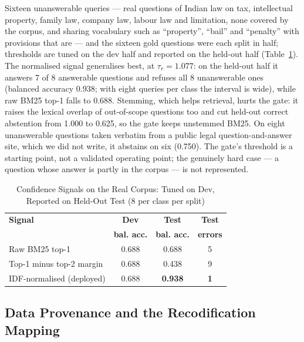 \documentclass[conference]{IEEEtran}
\begin{document}
Sixteen unanswerable queries --- real questions of Indian law on tax, intellectual property, family law, company law, labour law and limitation, none covered by the corpus, and sharing vocabulary such as ``property'', ``bail'' and ``penalty'' with provisions that are --- and the sixteen gold questions were each split in half; thresholds are tuned on the dev half and reported on the held-out half (Table~\ref{tab:realconf}). The normalised signal generalises best, at $\tau_r = 1.077$: on the held-out half it answers 7 of 8 answerable questions and refuses all 8 unanswerable ones (balanced accuracy 0.938; with eight queries per class the interval is wide), while raw BM25 top-1 falls to 0.688. Stemming, which helps retrieval, hurts the gate: it raises the lexical overlap of out-of-scope questions too and cut held-out correct abstention from 1.000 to 0.625, so the gate keeps unstemmed BM25. On eight unanswerable questions taken verbatim from a public legal question-and-answer site, which we did not write, it abstains on six (0.750). The gate's threshold is a starting point, not a validated operating point; the genuinely hard case --- a question whose answer is partly in the corpus --- is not represented.

\begin{table}[t]
\caption{Confidence Signals on the Real Corpus: Tuned on Dev, Reported on Held-Out Test (8 per class per split)}
\label{tab:realconf}
\centering
\footnotesize
\begin{tabular}{@{}lccc@{}}
\toprule
\textbf{Signal} & \textbf{Dev} & \textbf{Test} & \textbf{Test} \\
                & \textbf{bal. acc.} & \textbf{bal. acc.} & \textbf{errors} \\
\midrule
Raw BM25 top-1            & 0.688 & 0.688 & 5 \\
Top-1 minus top-2 margin  & 0.688 & 0.438 & 9 \\
IDF-normalised (deployed) & 0.688 & \textbf{0.938} & \textbf{1} \\
\bottomrule
\end{tabular}
\end{table}

\subsection{Data Provenance and the Recodification Mapping}
\label{ssec:provenance}
\end{document}
